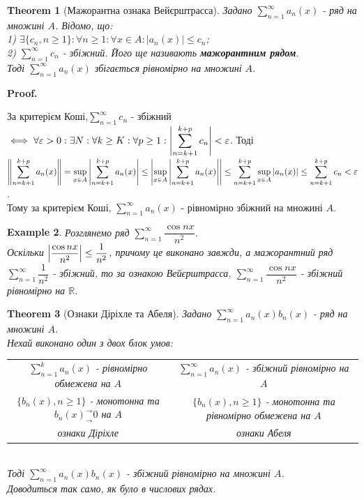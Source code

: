 \documentclass[a4paper, 10pt]{article}
\makeatletter
\def\huge{\displaystyle}
\def\qed{$\blacksquare$}
\theoremstyle{theoremdd}
\newtheorem{theorem}{Theorem}[subsection]
\theoremstyle{theoremdd}
\theoremstyle{theoremdd}
\theoremstyle{theoremdd}
\newtheorem{example}[theorem]{Example}
\theoremstyle{theoremdd}
\theoremstyle{theoremdd}
\theoremstyle{theoremdd}
\theoremstyle{theoremdd}
\renewenvironment{proof}[1][Proof.\\]{\par
\pushQED{\hfill \qed}%
\normalfont \topsep6\p@\@plus6\p@\relax
\trivlist
\item\relax
{\bfseries
#1\@addpunct{.}}\hspace\labelsep\ignorespaces
}{%
\popQED\endtrivlist\@endpefalse
}
\makeatother
\begin{document}
\begin{theorem}[Мажорантна ознака Вейєрштрасса]
Задано $\huge \sum_{n=1}^\infty a_n(x)$ - ряд на множині $A$. Відомо, що:\\
1) $\exists \{c_n, n \geq 1\}: \forall n \geq 1: \forall x \in A: |a_n(x)| \leq c_n$;\\
2) $\huge \sum_{n=1}^\infty c_n$ - збіжний. Його ще називають \textbf{мажорантним рядом}.\\
Тоді $\huge \sum_{n=1}^\infty a_n(x)$ збігається рівномірно на множині $A$.
\end{theorem}

\begin{proof}
За критерієм Коші,$\huge \sum_{n=1}^\infty c_n$ - збіжний $\iff \forall \varepsilon > 0: \exists N: \forall k \geq K: \forall p \geq 1: \huge \abs{\sum_{n=k+1}^{k+p} c_n} < \varepsilon$. Тоді\\
$\huge \left\lVert \sum_{n=k+1}^{k+p} a_n(x) \right\rVert = \sup_{x \in A} \abs{ \sum_{n=k+1}^{k+p} a_n(x)} \leq \abs{ \sup_{x \in A} \abs{ \sum_{n=k+1}^{k+p} a_n(x)} } \leq \sum_{n=k+1}^{k+p} \sup_{x \in A} |a_n(x)| \leq \sum_{n=k+1}^{k+p} c_n < \varepsilon$.\\
Тому за критерієм Коші, $\huge \sum_{n=1}^\infty a_n(x)$ - рівномірно збіжний на множині $A$.
\end{proof}

\begin{example}
Розглянемо ряд $\huge\sum_{n=1}^\infty \dfrac{\cos nx}{n^2}$.\\
Оскільки $\abs{\dfrac{\cos nx}{n^2}} \leq \dfrac{1}{n^2}$, причому це виконано завжди, а мажорантний ряд $\huge\sum_{n=1}^\infty \dfrac{1}{n^2}$ - збіжний, то за ознакою Вейєрштрасса, $\huge\sum_{n=1}^\infty \dfrac{\cos nx}{n^2}$ - збіжний рівномірно на $\mathbb{R}$.
\end{example}

\begin{theorem}[Ознаки Діріхле та Абеля]
Задано  $\huge \sum_{n=1}^\infty a_n(x) b_n(x)$ - ряд на множині $A$.\\
Нехай виконано один з двох блок умов:\\
\begin{tabular}{c | c}
$\huge\sum_{n=1}^k a_n(x)$ - рівномірно обмежена на $A$ & $\huge \sum_{n=1}^{\infty} a_n(x)$ - збіжний рівномірно на $A$ \\
$\{b_n(x), n \geq 1\}$ - монотонна та $b_n(x)^\rightarrow_\rightarrow 0$ на $A$ & $\{b_n(x), n \geq 1\}$ - монотонна та рівномірно обмежена на $A$\\
\textit{ознаки Діріхле} & \textit{ознаки Абеля}
\end{tabular}\\
Тоді $\huge \sum_{n=1}^{\infty} a_n(x) b_n(x)$ - збіжний рівномірно на множині $A$.\\
\textit{Доводиться так само, як було в числових рядах.}
\end{theorem}
\end{document}
